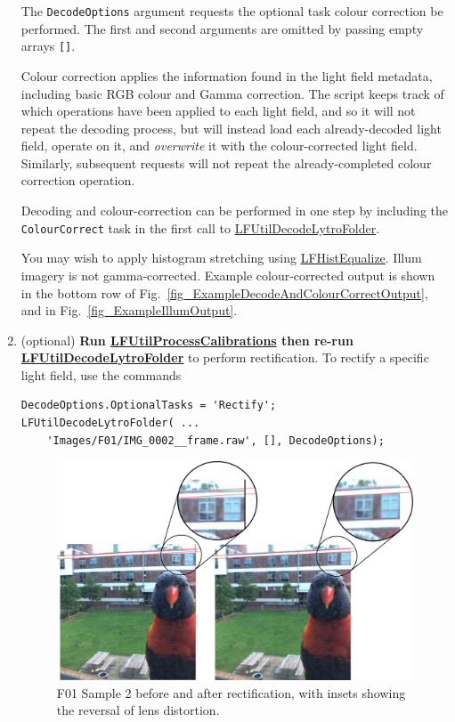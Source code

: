 \documentclass[onecolumn]{article}
\newcommand{\CiteFunction}[1]{\hyperlink{#1}{\small #1}}
\newcommand{\SymbolText}[1]{\texttt{\small #1}}
\begin{document}
\begin{enumerate}[leftmargin=1.5em,rightmargin=0.5cm]
The \SymbolText{DecodeOptions} argument requests the optional task colour correction be performed. The first and second arguments are omitted by passing empty arrays \SymbolText{[]}.

Colour correction applies the information found in the light field metadata, including basic RGB colour and Gamma correction. The script keeps track of which operations have been applied to each light field, and so it will not repeat the decoding process, but will instead load each already-decoded light field, operate on it, and \emph{overwrite} it with the colour-corrected light field. Similarly, subsequent requests will not repeat the already-completed colour correction operation.

Decoding and colour-correction can be performed in one step by including the \SymbolText{ColourCorrect} task in the first call to \CiteFunction{LFUtilDecodeLytroFolder}.

You may wish to apply histogram stretching using \CiteFunction{LFHistEqualize}. Illum imagery is not gamma-corrected.  Example colour-corrected output is shown in the bottom row of Fig.~\ref{fig_ExampleDecodeAndColourCorrectOutput}, and in Fig.~\ref{fig_ExampleIllumOutput}.

\item (optional) \textbf{Run \CiteFunction{LFUtilProcessCalibrations} then re-run \CiteFunction{LFUtilDecodeLytroFolder}} to perform rectification. To rectify a specific light field, use the commands
\begin{Verbatim}
DecodeOptions.OptionalTasks = 'Rectify';
LFUtilDecodeLytroFolder( ...
    'Images/F01/IMG_0002__frame.raw', [], DecodeOptions);
\end{Verbatim}

\begin{figure}[tbh]
	\centering
	\includegraphics[width=1\textwidth]{Figs/Sample2_RectExample}
	\caption{F01 Sample 2 before and after rectification, with insets showing the reversal of lens distortion.}
	\label{fig_RectificationDetail}
\end{figure}


\end{enumerate}
\end{document}
